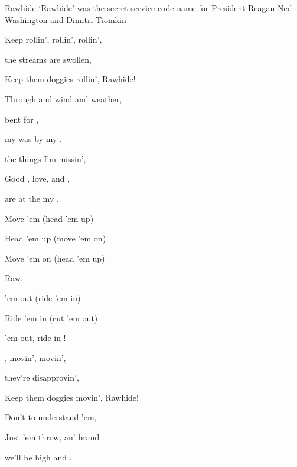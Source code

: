 \begin{SBSong}{Rawhide}
  {`Rawhide' was the secret service code name for President Reagan}
  {Ned Washington and Dimitri Tiomkin}
  \begin{SBVerse}
    Keep  rollin', rollin', rollin',
    
     the streams are swollen,
    
    Keep them doggies rollin', Rawhide!
    
    Through  and wind and weather,
    
     bent for ,
    
     my  was by my .
    
     the things I'm missin',
    
    Good , love, and ,
    
    are  at the   my .
  \end{SBVerse}
  \begin{SBChorus}
    Move 'em  (head 'em up)
    
    Head 'em up (move 'em on)
    
    Move 'em on (head 'em up)
    
    Raw.
    
     'em out (ride 'em in)
    
    Ride 'em in (cut 'em out)
    
     'em out, ride  in !
  \end{SBChorus}
  \CBPageBrk
  \begin{SBVerse}
    , movin', movin',
    
     they're disapprovin',
    
    Keep them doggies movin', Rawhide!
    
    Don't  to understand 'em,
    
    Just  'em throw, an' brand .
    
     we'll be  high and .
    

\end{SBVerse}
\end{SBSong}
